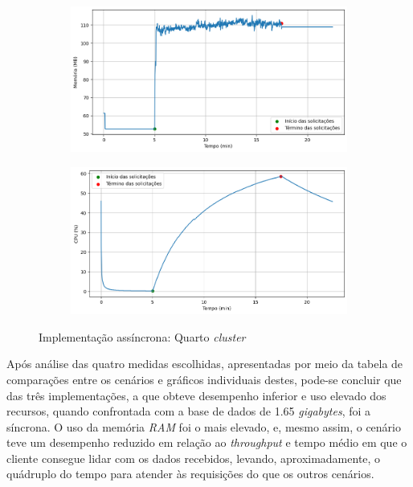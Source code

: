 \documentclass[12pt]{article}
\begin{document}
\begin{figure}[H]
		\centering
		\begin{subfigure}[H]{0.45\textwidth}
				\centering
				\label{fig:async-cluster_usage_3a}
				\includegraphics[width=1\textwidth]{images/pt-br/results/async-cluster_memory_usage_3.png}
		\end{subfigure}
		\hfill%
		\begin{subfigure}[H]{0.45\textwidth}
				\centering
				\label{fig:async-cluster_usage_3b}
				\includegraphics[width=1\textwidth]{images/pt-br/results/async-cluster_cpu_usage_3.png}
		\end{subfigure}
		
		\caption{Implementação assíncrona: Quarto \textit{cluster}}\label{fig:async-cluster_usage_3}
\end{figure}

Após análise das quatro medidas escolhidas, apresentadas por meio da tabela de comparações
entre os cenários e gráficos individuais destes, pode-se concluir que das três 
implementações, a que obteve desempenho inferior e uso elevado dos recursos, quando confrontada 
com a base de dados de 1.65 \textit{gigabytes}, foi a síncrona. O uso da memória \textit{RAM}
foi o mais elevado, e, mesmo assim, o cenário teve um desempenho reduzido em relação ao 
\textit{throughput} e tempo médio em que o cliente consegue lidar com os dados recebidos, levando, aproximadamente,
o quádruplo do tempo para atender às requisições do que os outros cenários.
\end{document}
